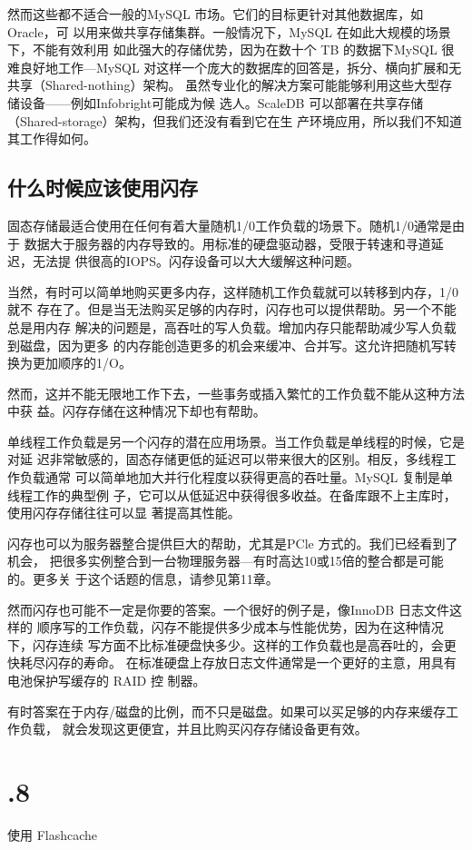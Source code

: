 然而这些都不适合一般的MySQL 市场。它们的目标更针对其他数据库，如 Oracle，可
以用来做共享存储集群。一般情况下，MySQL 在如此大规模的场景下，不能有效利用
如此强大的存储优势，因为在数十个 TB 的数据下MySQL 很难良好地工作—MySQL
对这样一个庞大的数据库的回答是，拆分、横向扩展和无共享（Shared-nothing）架构。
虽然专业化的解决方案可能能够利用这些大型存储设备——例如Infobright可能成为候
选人。ScaleDB 可以部署在共享存储（Shared-storage）架构，但我们还没有看到它在生
产环境应用，所以我们不知道其工作得如何。

\subsection{什么时候应该使用闪存}
固态存储最适合使用在任何有着大量随机1/0工作负载的场景下。随机1/0通常是由于
数据大于服务器的内存导致的。用标准的硬盘驱动器，受限于转速和寻道延迟，无法提
供很高的IOPS。闪存设备可以大大缓解这种问题。

当然，有时可以简单地购买更多内存，这样随机工作负载就可以转移到内存，1/0就不
存在了。但是当无法购买足够的内存时，闪存也可以提供帮助。另一个不能总是用内存
解决的问题是，高吞吐的写人负载。增加内存只能帮助减少写人负载到磁盘，因为更多
的内存能创造更多的机会来缓冲、合并写。这允许把随机写转换为更加顺序的1/O。

然而，这并不能无限地工作下去，一些事务或插入繁忙的工作负载不能从这种方法中获
益。闪存存储在这种情况下却也有帮助。

单线程工作负载是另一个闪存的潜在应用场景。当工作负载是单线程的时候，它是对延
迟非常敏感的，固态存储更低的延迟可以带来很大的区别。相反，多线程工作负载通常
可以简单地加大并行化程度以获得更高的吞吐量。MySQL 复制是单线程工作的典型例
子，它可以从低延迟中获得很多收益。在备库跟不上主库时，使用闪存存储往往可以显
著提高其性能。

闪存也可以为服务器整合提供巨大的帮助，尤其是PCle 方式的。我们已经看到了机会，
把很多实例整合到一台物理服务器—有时高达10或15倍的整合都是可能的。更多关
于这个话题的信息，请参见第11章。

然而闪存也可能不一定是你要的答案。一个很好的例子是，像InnoDB 日志文件这样的
顺序写的工作负载，闪存不能提供多少成本与性能优势，因为在这种情况下，闪存连续
写方面不比标准硬盘快多少。这样的工作负载也是高吞吐的，会更快耗尽闪存的寿命。
在标准硬盘上存放日志文件通常是一个更好的主意，用具有电池保护写缓存的 RAID 控
制器。

有时答案在于内存/磁盘的比例，而不只是磁盘。如果可以买足够的内存来缓存工作负载，
就会发现这更便宜，并且比购买闪存存储设备更有效。

\section{.8}
使用 Flashcache

